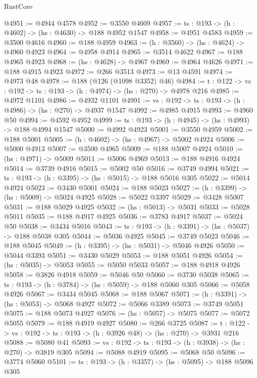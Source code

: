 \begin{lexlean}{RustCore}
\begin{coremodule}
@4951 := @4944 @4578
@4952 := @3550 @4609
@4957 := {ts : @193} -> (h : @4602) -> (hs : @4630) -> @188 @4952 @1547
@4958 := @4951 @4583
@4959 := @3500 @4616
@4960 := @188 @4959
@4963 := (h : @3560) -> (hs : @4624) -> @4960 @4923
@4964 := @4958 @4914
@4965 := @3514 @4622
@4967 := @188 @4965 @4923
@4968 := (hs : @4628) -> @4967
@4969 := @4964 @4626
@4971 := @188 @4915 @4923
@4972 := @266 @3513
@4973 := @13 @4591
@4974 := @4973 @48
@4978 := @188 (@126 (@1098 @3352) @46)
@4984 := {t : @122} -> {vs : @192} -> {ts : @193} -> (h : @4974) -> (hs : @270) -> @4978 @216
@4985 := @4972 @1101
@4986 := @4932 @1101
@4991 := {vs : @192} -> {ts : @193} -> (h : @4986) -> (hs : @270) -> @4937 @1547
@4992 := @4985 @4915
@4993 := @4960 @50
@4994 := @4592 @4952
@4999 := {ts : @193} -> (h : @4945) -> (hs : @4993) -> @188 @4994 @1547
@5000 := @4992 @4923
@5001 := @3550 @4959
@5002 := @188 @5001
@5005 := (h : @4602) -> (hs : @4967) -> @5002 @4924
@5006 := @5000 @4913
@5007 := @3500 @4965
@5009 := @188 @5007 @4924
@5010 := (hs : @4971) -> @5009
@5011 := @5006 @4969
@5013 := @188 @4916 @4924
@5014 := @3739 @4916
@5015 := @5002 @50
@5016 := @3749 @4994
@5021 := {ts : @193} -> (h : @3395) -> (hs : @5015) -> @188 @5016 @305
@5022 := @5014 @4924
@5023 := @3430 @5001
@5024 := @188 @5023
@5027 := (h : @3399) -> (hs : @5009) -> @5024 @4925
@5028 := @5022 @3397
@5029 := @3428 @5007
@5031 := @188 @5029 @4925
@5032 := (hs : @5013) -> @5031
@5033 := @5028 @5011
@5035 := @188 @4917 @4925
@5036 := @3783 @4917
@5037 := @5024 @50
@5038 := @3434 @5016
@5043 := {ts : @193} -> (h : @3391) -> (hs : @5037) -> @188 @5038 @305
@5044 := @5036 @4925
@5045 := @3749 @5023
@5046 := @188 @5045
@5049 := (h : @3395) -> (hs : @5031) -> @5046 @4926
@5050 := @5044 @3393
@5051 := @3430 @5029
@5053 := @188 @5051 @4926
@5054 := (hs : @5035) -> @5053
@5055 := @5050 @5033
@5057 := @188 @4918 @4926
@5058 := @3826 @4918
@5059 := @5046 @50
@5060 := @3730 @5038
@5065 := {ts : @193} -> (h : @3784) -> (hs : @5059) -> @188 @5060 @305
@5066 := @5058 @4926
@5067 := @3434 @5045
@5068 := @188 @5067
@5071 := (h : @3391) -> (hs : @5053) -> @5068 @4927
@5072 := @5066 @3389
@5073 := @3749 @5051
@5075 := @188 @5073 @4927
@5076 := (hs : @5057) -> @5075
@5077 := @5072 @5055
@5079 := @188 @4919 @4927
@5080 := @266 @3725
@5087 := {t : @122} -> {vs : @192} -> {ts : @193} -> (h : @3926 @48) -> (hs : @270) -> @3931 @216
@5088 := @5080 @41
@5093 := {vs : @192} -> {ts : @193} -> (h : @3938) -> (hs : @270) -> @3819 @305
@5094 := @5088 @4919
@5095 := @5068 @50
@5096 := @3774 @5060
@5101 := {ts : @193} -> (h : @3357) -> (hs : @5095) -> @188 @5096 @305

\end{coremodule}
\end{lexlean}
